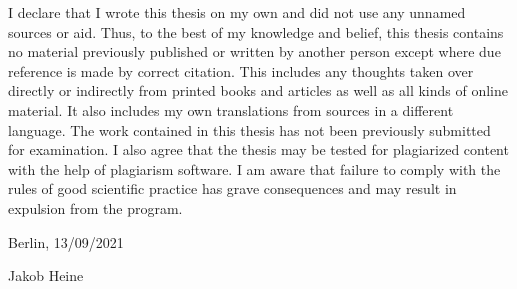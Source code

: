 
I declare that I wrote this thesis on my own and did not use any unnamed sources or aid. Thus, to the best of my knowledge and belief, this thesis contains no material previously published or written by another person except where due reference is made by correct citation. This includes any thoughts taken over directly or indirectly from printed books and articles as well as all kinds of online material. It also includes my own translations from sources in a different language. The work contained in this thesis has not been previously submitted for examination. I also agree that the thesis may be tested for plagiarized content with the help of plagiarism software. I am aware that failure to comply with the rules of good scientific practice has grave consequences and may result in expulsion from the program.

\vskip 1cm

Berlin, 13/09/2021

\vskip 1.5cm

Jakob Heine